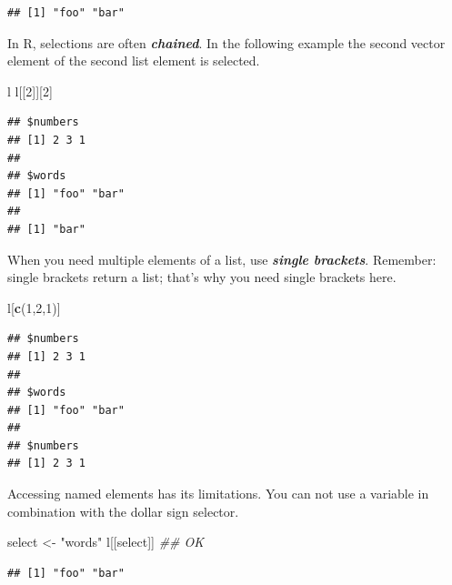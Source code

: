 \documentclass[]{book}
\newenvironment{Shaded}{\begin{snugshade}}{\end{snugshade}}
\newcommand{\CommentTok}[1]{\textcolor[rgb]{0.56,0.35,0.01}{\textit{#1}}}
\newcommand{\DecValTok}[1]{\textcolor[rgb]{0.00,0.00,0.81}{#1}}
\newcommand{\KeywordTok}[1]{\textcolor[rgb]{0.13,0.29,0.53}{\textbf{#1}}}
\newcommand{\NormalTok}[1]{#1}
\newcommand{\OperatorTok}[1]{\textcolor[rgb]{0.81,0.36,0.00}{\textbf{#1}}}
\newcommand{\StringTok}[1]{\textcolor[rgb]{0.31,0.60,0.02}{#1}}
\begin{document}
\begin{verbatim}
## [1] "foo" "bar"
\end{verbatim}

In R, selections are often \textbf{\emph{chained}}. In the following example the second vector element of the second list element is selected.

\begin{Shaded}
\begin{Highlighting}[]
\NormalTok{l}
\NormalTok{l[[}\DecValTok{2}\NormalTok{]][}\DecValTok{2}\NormalTok{] }
\end{Highlighting}
\end{Shaded}

\begin{verbatim}
## $numbers
## [1] 2 3 1
## 
## $words
## [1] "foo" "bar"
## 
## [1] "bar"
\end{verbatim}

When you need multiple elements of a list, use \textbf{\emph{single brackets}}. Remember: single brackets return a list; that's why you need single brackets here.

\begin{Shaded}
\begin{Highlighting}[]
\NormalTok{l[}\KeywordTok{c}\NormalTok{(}\DecValTok{1}\NormalTok{,}\DecValTok{2}\NormalTok{,}\DecValTok{1}\NormalTok{)]}
\end{Highlighting}
\end{Shaded}

\begin{verbatim}
## $numbers
## [1] 2 3 1
## 
## $words
## [1] "foo" "bar"
## 
## $numbers
## [1] 2 3 1
\end{verbatim}

Accessing named elements has its limitations. You can not use a variable in combination with the dollar sign selector.

\begin{Shaded}
\begin{Highlighting}[]
\NormalTok{select <-}\StringTok{ "words"}
\NormalTok{l[[select]] }\CommentTok{## OK}
\end{Highlighting}
\end{Shaded}

\begin{verbatim}
## [1] "foo" "bar"
\end{verbatim}

\begin{Shaded}
\end{Shaded}
\end{document}
